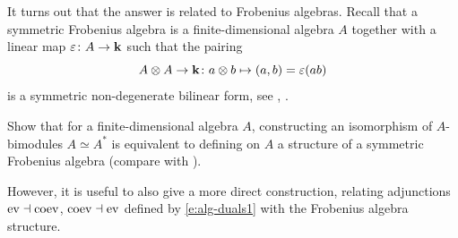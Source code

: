 It turns out that the answer is related to Frobenius algebras. Recall that a
symmetric Frobenius algebra is a finite-dimensional algebra $A$ together with a
linear map $\varepsilon\colon A\to\mathbf{k}$ such that the pairing
$$
  A\otimes A\to \mathbf{k}\colon
  a\otimes b \mapsto (a,b)=\varepsilon(ab)
$$
is a symmetric non-degenerate bilinear form, see ,
.




\begin{exercise}\label{ec:fd-algebra-separable}
  Show that for a finite-dimensional algebra $A$, constructing an isomorphism of
  $A$-bimodules $A\simeq A^*$ is equivalent to defining on $A$ a structure of
  a symmetric Frobenius algebra (compare with ).
\end{exercise}


However, it is useful to also give a more direct construction, relating
adjunctions $\operatorname{ev}\dashv\operatorname{coev}$, $\operatorname{coev}\dashv\operatorname{ev}$ defined by \eqref{e:alg-duals1}
with the Frobenius algebra structure.

